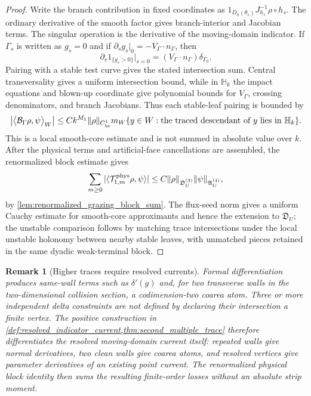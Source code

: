 \documentclass[11pt]{amsart}
\theoremstyle{compactplain}
\theoremstyle{compactdefinition}
\theoremstyle{compactremark}
\newtheorem*{remark*}{Remark}
\newcommand{\Hstrip}{\mathbb H}
\begin{document}
\begin{proof}
Write the branch contribution in fixed coordinates as
$1_{D_h(\theta_s)}J_{h_s}^{-1}\rho\circ h_s$.  The ordinary derivative of the
smooth factor gives branch-interior and Jacobian terms.  The singular operation
is the derivative of the moving-domain indicator.  If \(\Gamma_s\) is written as
$g_s=0$ and if $\partial_s g_s|_0=-V_\Gamma\cdot n_\Gamma$, then
\begin{equation}
  \partial_s 1_{\{g_s>0\}}\big|_{s=0}
  =(V_\Gamma\cdot n_\Gamma)\delta_{\Gamma_0}.
\end{equation}
Pairing with a stable test curve gives the stated intersection sum.  Central
transversality gives a uniform intersection bound, while in \(\Hstrip_k\) the
impact equations and blown-up coordinate give polynomial bounds for
\(V_\Gamma\), crossing denominators, and branch Jacobians.  Thus each
stable-leaf
pairing is bounded by
\begin{equation}
  \left|
  \big\langle \mathcal B_\Gamma\rho,\psi\big\rangle_W
  \right|
  \le
  C k^{M_1}\|\rho\|_{C^1_{\rm br}}
  m_W\{y\in W:\hbox{the traced descendant of }y\hbox{ lies in }\Hstrip_k\}.
\end{equation}
This is a local smooth-core estimate and is not summed in absolute value over
\(k\).  After the physical terms and artificial-face cancellations are
assembled, the renormalized block estimate gives
\begin{equation}
  \sum_{m\ge0}
  |\langle\mathcal T_{1,m}^{\rm phys}\rho,\psi\rangle|
  \le C\|\rho\|_{\mathfrak D_U^{(3)}}
         \|\psi\|_{\mathfrak A_U^{(4)}},
\end{equation}
by \cref{lem:renormalized_grazing_block_sum}.  The flux-seed norm gives a
uniform Cauchy estimate for smooth-core approximants and hence the extension to
\(\mathfrak D_U\); the unstable comparison follows
by matching trace intersections under the local unstable holonomy between
nearby stable leaves, with unmatched pieces retained in the same dyadic
weak-terminal block.
\end{proof}


\begin{remark*}[Higher traces require resolved currents]
Formal differentiation produces same-wall terms such as
\(\delta'(g)\) and, for two transverse walls in the two-dimensional collision
section, a codimension-two coarea atom.  Three or more independent delta
constraints are not defined by declaring their intersection a finite vertex.
The positive construction in \cref{def:resolved_indicator_current,thm:second_multiple_trace}
therefore differentiates the resolved moving-domain current itself: repeated
walls give normal derivatives, two clean walls give coarea atoms, and resolved
vertices give parameter derivatives of an existing point current.  The
renormalized physical block identity then sums the resulting finite-order
losses without an absolute strip moment.
\end{remark*}
\end{document}
